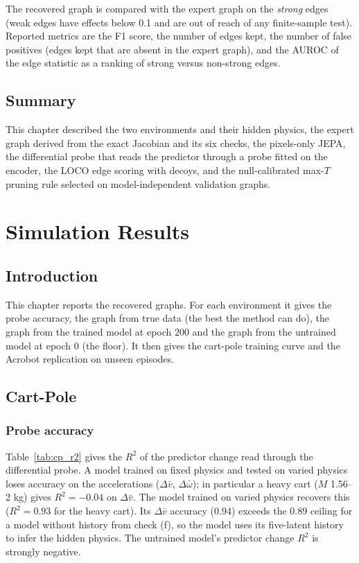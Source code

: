 \documentclass[11pt, a4paper, oneside,enumerate,textcomp]{report}
\newcommand{\vb}{\bar{v}}
\newcommand{\wb}{\bar{\omega}}
\newcommand{\dd}{\Delta}
\newcommand{\Rsq}{R^2}
\begin{document}
The recovered graph is compared with the expert graph on the \emph{strong} edges (weak edges have effects below 0.1 and are out of reach of any finite-sample test). Reported metrics are the F1 score, the number of edges kept, the number of false positives (edges kept that are absent in the expert graph), and the AUROC of the edge statistic as a ranking of strong versus non-strong edges.

\section{Summary}

This chapter described the two environments and their hidden physics, the expert graph derived from the exact Jacobian and its six checks, the pixels-only JEPA, the differential probe that reads the predictor through a probe fitted on the encoder, the LOCO edge scoring with decoys, and the null-calibrated max-$T$ pruning rule selected on model-independent validation graphs.


\chapter{Simulation Results}
\thispagestyle{empty}

\section{Introduction}

This chapter reports the recovered graphs. For each environment it gives the probe accuracy, the graph from true data (the best the method can do), the graph from the trained model at epoch 200 and the graph from the untrained model at epoch 0 (the floor). It then gives the cart-pole training curve and the Acrobot replication on unseen episodes.

\section{Cart-Pole}

\subsection{Probe accuracy}

Table~\ref{tab:cp_r2} gives the $\Rsq$ of the predictor change read through the differential probe. A model trained on fixed physics and tested on varied physics loses accuracy on the accelerations ($\dd\vb$, $\dd\wb$); in particular a heavy cart ($M$ 1.56--2 kg) gives $\Rsq = -0.04$ on $\dd\vb$. The model trained on varied physics recovers this ($\Rsq = 0.93$ for the heavy cart). Its $\dd\vb$ accuracy (0.94) exceeds the 0.89 ceiling for a model without history from check (f), so the model uses its five-latent history to infer the hidden physics. The untrained model's predictor change $\Rsq$ is strongly negative.
\end{document}
